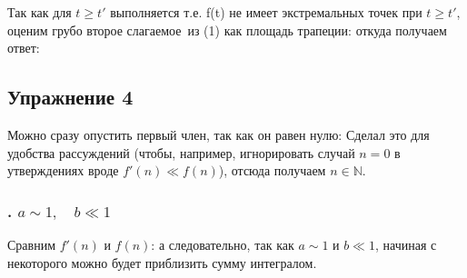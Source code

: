 \documentclass[a4paper, 12pt]{article}
\begin{document}
Так как для $t \ge t'$ выполняется
т.е. f(t) не имеет экстремальных точек при $t \ge t'$, оценим грубо второе слагаемое\
из (1) как площадь трапеции:
откуда получаем 
ответ:

\subsection*{Упражнение 4}
Можно сразу опустить первый член, так как он равен нулю:
Сделал это для удобства рассуждений (чтобы, например, игнорировать случай $n = 0$ в утверждениях вроде $f'(n) \ll f(n)$), отсюда получаем $n \in \mathbb{N}$.
\subsubsection*{\Rnum{1}. $a \sim 1,\quad b \ll 1$}
Сравним $f'(n)$ и $f(n)$:
а следовательно, так как $a \sim 1$ и $b \ll 1$, начиная с некоторого
\salign{n' \gg 1,}
можно будет приблизить сумму интегралом.
\end{document}
